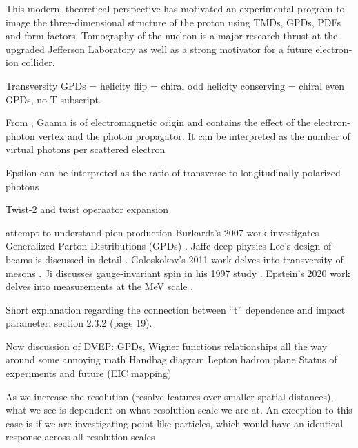 This modern, theoretical perspective has motivated an experimental program to image the three-dimensional structure of the proton using TMDs, GPDs, PDFs and form factors. Tomography of the nucleon is a major research thrust at the upgraded Jefferson Laboratory as well as a strong motivator for a future electron-ion collider.



Transversity GPDs = helicity flip = chiral odd
helicity conserving = chiral even GPDs, no T subscript. 

From \cite{Amaldi1979Pion-electroproduction}, Gaama is of electromagnetic origin and contains the effect of the electron-photon vertex and the photon propagator. It can be interpreted as the number of virtual photons per scattered electron 

Epsilon can be interpreted as the ratio of transverse to longitudinally polarized photons


Twist-2 and twist operaator expansion


attempt to understand pion production \cite{Goloskokov2010AnElectroproduction}
Burkardt's 2007 work investigates Generalized Parton Distributions (GPDs) \cite{Burkardt2007GPDs0}.
Jaffe deep physics \cite{Jaffe2022DeepPhysics} 
Lee's design of beams is discussed in detail \cite{Lee2019DesignBeam}.
Goloskokov's 2011 work delves into transversity of mesons \cite{Goloskokov2011TransversityMesons}.
Ji discusses gauge-invariant spin in his 1997 study \cite{Ji1997Gauge-InvariantSpin}.
Epstein's 2020 work delves into measurements at the MeV scale \cite{Epstein2020MeasurementMeV}.


Short explanation regarding the connection between “t” dependence and impact parameter.
section 2.3.2 (page 19).


    Now discussion of DVEP:
GPDs, Wigner functions
relationships all the way around
some annoying math
Handbag diagram
Lepton hadron plane
Status of experiments and future (EIC mapping)

        As we increase the resolution (resolve features over smaller spatial distances), what we see is dependent on what resolution scale we are at. An exception to this case is if we are investigating point-like particles, which would have an identical response across all resolution scales


